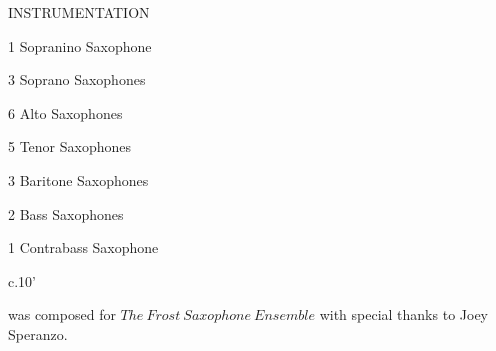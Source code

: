 \documentclass[10pt]{article}
\begin{document}
\begin{center}
\huge INSTRUMENTATION
\end{center}
\begin{center}
1 Sopranino Saxophone
\end{center}
\begin{center}
3 Soprano Saxophones
\end{center}
\begin{center}
6 Alto Saxophones
\end{center}
\begin{center}
5 Tenor Saxophones
\end{center}
\begin{center}
3 Baritone Saxophones
\end{center}
\begin{center}
2 Bass Saxophones
\end{center}
\begin{center}
1 Contrabass Saxophone
\end{center}

\vspace*{5\baselineskip}

\begin{center}
c.10'
\end{center}

\vspace*{5\baselineskip}

\begin{center}
 was composed for $The \ Frost \ Saxophone \ Ensemble$ with special thanks to Joey Speranzo.
\end{center}
\end{document}
